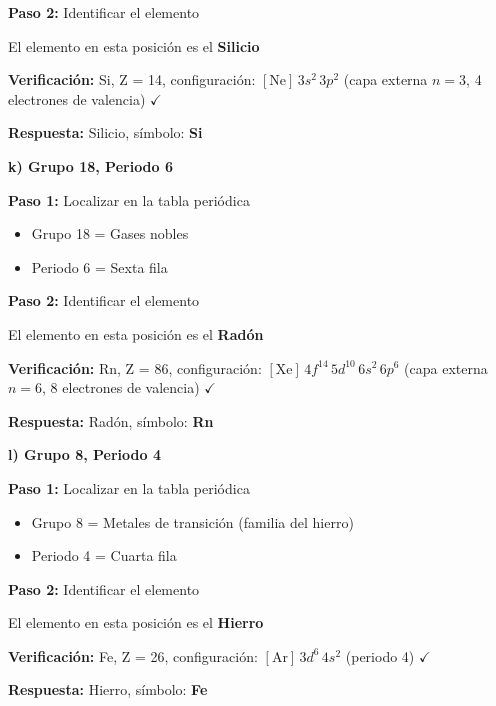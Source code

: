 \begin{exercise}
\begin{solu}
        \textbf{Paso 2:} Identificar el elemento

        El elemento en esta posición es el \textbf{Silicio}

        \textbf{Verificación:} Si, Z = 14, configuración: \([\text{Ne}] \, 3s^2 \, 3p^2\) (capa externa \(n = 3\), 4 electrones de valencia) \(\checkmark\)

        \textbf{Respuesta:} Silicio, símbolo: \textbf{Si}

        \textbf{k) Grupo 18, Periodo 6}

        \textbf{Paso 1:} Localizar en la tabla periódica
        \begin{itemize}
            \item Grupo 18 = Gases nobles
            \item Periodo 6 = Sexta fila
        \end{itemize}

        \textbf{Paso 2:} Identificar el elemento

        El elemento en esta posición es el \textbf{Radón}

        \textbf{Verificación:} Rn, Z = 86, configuración: \([\text{Xe}] \, 4f^{14} \, 5d^{10} \, 6s^2 \, 6p^6\) (capa externa \(n = 6\), 8 electrones de valencia) \(\checkmark\)

        \textbf{Respuesta:} Radón, símbolo: \textbf{Rn}

        \textbf{l) Grupo 8, Periodo 4}

        \textbf{Paso 1:} Localizar en la tabla periódica
        \begin{itemize}
            \item Grupo 8 = Metales de transición (familia del hierro)
            \item Periodo 4 = Cuarta fila
        \end{itemize}

        \textbf{Paso 2:} Identificar el elemento

        El elemento en esta posición es el \textbf{Hierro}

        \textbf{Verificación:} Fe, Z = 26, configuración: \([\text{Ar}] \, 3d^6 \, 4s^2\) (periodo 4) \(\checkmark\)

        \textbf{Respuesta:} Hierro, símbolo: \textbf{Fe}


\end{solu}
\end{exercise}
